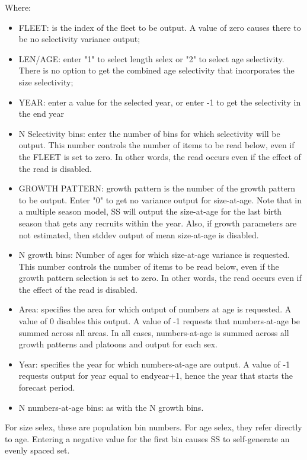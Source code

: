 Where:
\begin{itemize}
	\item FLEET:  is the index of the fleet to be output.  A value of zero causes there to be no selectivity variance output;
	\item LEN/AGE:  enter "1" to select length selex or "2" to select age selectivity.  There is no option to get the combined age selectivity that incorporates the size selectivity;
	\item YEAR:  enter a value for the selected year, or enter -1 to get the selectivity in the end year
	\item 	N Selectivity bins:  enter the number of bins for which selectivity will be output.  This number controls the number of items to be read below, even if the FLEET is set to zero.  In other words, the read occurs even if the effect of the read is disabled.
	\item GROWTH PATTERN:  growth pattern is the number of the growth pattern to be output.  Enter "0" to get no variance output for size-at-age.   Note that in a multiple season model, SS will output the size-at-age for the last birth season that gets any recruits within the year.  Also, if growth parameters are not estimated, then stddev output of mean size-at-age is disabled.
	\item 	N growth bins:  Number of ages for which size-at-age variance is requested.  This number controls the number of items to be read below, even if the growth pattern selection is set to zero.   In other words, the read occurs even if the effect of the read is disabled.
	\item 	Area:  specifies the area for which output of numbers at age is requested.  A value of 0 disables this output.  A value of -1 requests that numbers-at-age be summed across all areas.  In all cases, numbers-at-age is summed across all growth patterns and platoons and output for each sex.
	\item 	Year:  specifies the year for which numbers-at-age are output.  A value of -1 requests output for year equal to endyear+1, hence the year that starts the forecast period.
	\item N numbers-at-age bins:  as with the N growth bins.
\end{itemize}
For size selex, these are population bin numbers.  For age selex, they refer directly to age.  Entering a negative value for the first bin causes SS to self-generate an evenly spaced set.

